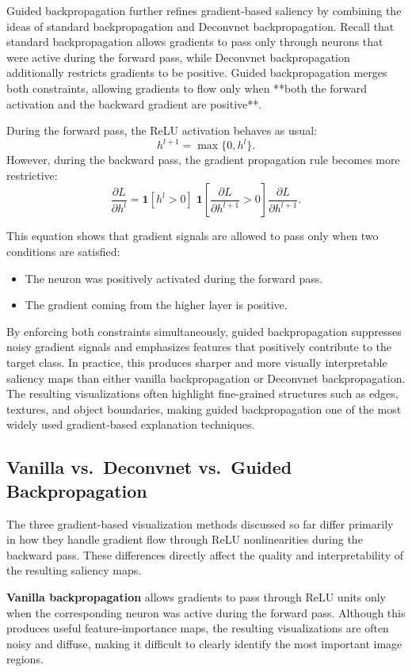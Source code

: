 \documentclass{article}
\begin{document}
Guided backpropagation further refines gradient-based saliency by combining the ideas of standard backpropagation and Deconvnet backpropagation. Recall that standard backpropagation allows gradients to pass only through neurons that were active during the forward pass, while Deconvnet backpropagation additionally restricts gradients to be positive. Guided backpropagation merges both constraints, allowing gradients to flow only when **both the forward activation and the backward gradient are positive**.

During the forward pass, the ReLU activation behaves as usual:
\[
h^{l+1} = \max\{0, h^l\}.
\]
However, during the backward pass, the gradient propagation rule becomes more restrictive:
\[
\frac{\partial L}{\partial h^l}
= \mathbf{1}[h^l > 0]\;
  \mathbf{1}\!\left[\frac{\partial L}{\partial h^{l+1}} > 0\right]
  \frac{\partial L}{\partial h^{l+1}}.
\]

This equation shows that gradient signals are allowed to pass only when two conditions are satisfied:
\begin{itemize}
\item The neuron was positively activated during the forward pass.
\item The gradient coming from the higher layer is positive.
\end{itemize}

By enforcing both constraints simultaneously, guided backpropagation suppresses noisy gradient signals and emphasizes features that positively contribute to the target class. In practice, this produces sharper and more visually interpretable saliency maps than either vanilla backpropagation or Deconvnet backpropagation. The resulting visualizations often highlight fine-grained structures such as edges, textures, and object boundaries, making guided backpropagation one of the most widely used gradient-based explanation techniques.


\subsection{Vanilla vs.\ Deconvnet vs.\ Guided Backpropagation}

The three gradient-based visualization methods discussed so far differ primarily in how they handle gradient flow through ReLU nonlinearities during the backward pass. These differences directly affect the quality and interpretability of the resulting saliency maps.

\textbf{Vanilla backpropagation} allows gradients to pass through ReLU units only when the corresponding neuron was active during the forward pass. Although this produces useful feature-importance maps, the resulting visualizations are often noisy and diffuse, making it difficult to clearly identify the most important image regions.
\end{document}
